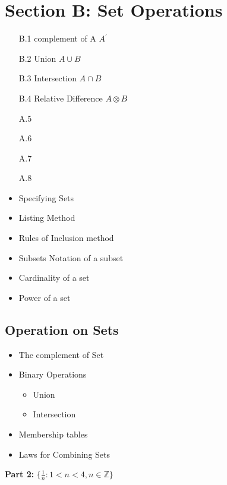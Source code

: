 \section*{Section B: Set Operations}
\begin{itemize}
\item[B.1] complement of A $A^{\prime}$
\item[B.2] Union $A \cup B$
\item[B.3] Intersection $A \cap B$
\item[B.4] Relative Difference $A \otimes B$
\item[A.5]
\item[A.6]
\item[A.7]
\item[A.8]
\end{itemize}
\newpage


\begin{itemize}
\item Specifying Sets
\item Listing Method
\item Rules of Inclusion method
\end{itemize}


\begin{itemize}
\item Subsets Notation of a subset
\item Cardinality of a set
\item Power of a set
\end{itemize}

\subsection*{Operation on Sets}

\begin{itemize}
\item The complement of Set
\item Binary Operations
\begin{itemize}
\item Union
\item Intersection
\end{itemize}
\item Membership tables
\item Laws for Combining Sets
\end{itemize}


\textbf{Part 2:} $ \{ \frac{1}{n}: 1 < n < 4, n \in \mathbb{Z} \} $




